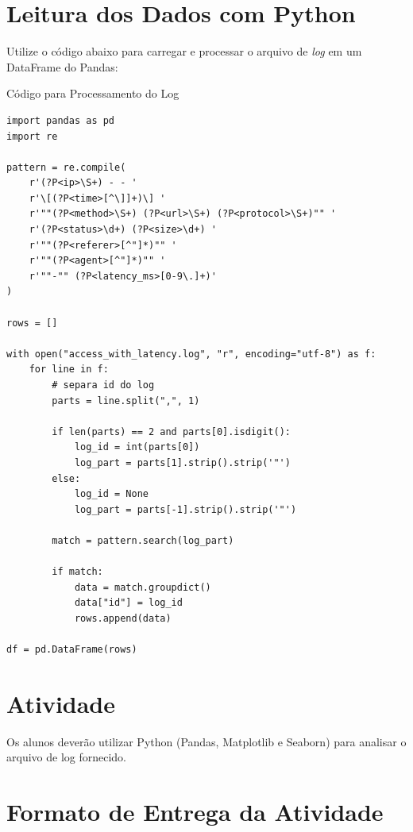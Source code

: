\documentclass[12pt,a4paper,twoside]{report}
\begin{document}
\section*{Leitura dos Dados com Python}

Utilize o código abaixo para carregar e processar o arquivo de \textit{log} em um DataFrame do Pandas:

\begin{block}{Código para Processamento do Log}
\small
\begin{verbatim}
import pandas as pd
import re

pattern = re.compile(
    r'(?P<ip>\S+) - - '
    r'\[(?P<time>[^\]]+)\] '
    r'""(?P<method>\S+) (?P<url>\S+) (?P<protocol>\S+)"" '
    r'(?P<status>\d+) (?P<size>\d+) '
    r'""(?P<referer>[^"]*)"" '
    r'""(?P<agent>[^"]*)"" '
    r'""-"" (?P<latency_ms>[0-9\.]+)'
)

rows = []

with open("access_with_latency.log", "r", encoding="utf-8") as f:
    for line in f:
        # separa id do log
        parts = line.split(",", 1)

        if len(parts) == 2 and parts[0].isdigit():
            log_id = int(parts[0])
            log_part = parts[1].strip().strip('"')
        else:
            log_id = None
            log_part = parts[-1].strip().strip('"')

        match = pattern.search(log_part)

        if match:
            data = match.groupdict()
            data["id"] = log_id
            rows.append(data)

df = pd.DataFrame(rows)
\end{verbatim}
\end{block}

\section*{Atividade}

Os alunos deverão utilizar Python (Pandas, Matplotlib e Seaborn) para analisar o arquivo de log fornecido.
\section*{Formato de Entrega da Atividade}
\end{document}
